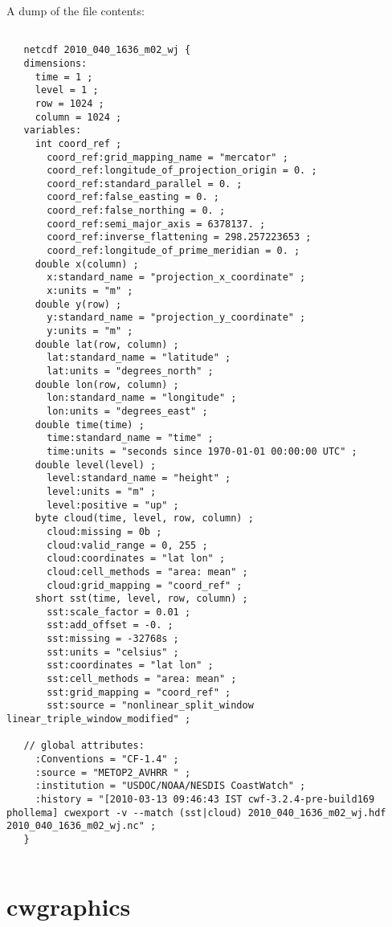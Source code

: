  A dump of the file contents: \begin{verbatim}

   netcdf 2010_040_1636_m02_wj {
   dimensions:
     time = 1 ;
     level = 1 ;
     row = 1024 ;
     column = 1024 ;
   variables:
     int coord_ref ;
       coord_ref:grid_mapping_name = "mercator" ;
       coord_ref:longitude_of_projection_origin = 0. ;
       coord_ref:standard_parallel = 0. ;
       coord_ref:false_easting = 0. ;
       coord_ref:false_northing = 0. ;
       coord_ref:semi_major_axis = 6378137. ;
       coord_ref:inverse_flattening = 298.257223653 ;
       coord_ref:longitude_of_prime_meridian = 0. ;
     double x(column) ;
       x:standard_name = "projection_x_coordinate" ;
       x:units = "m" ;
     double y(row) ;
       y:standard_name = "projection_y_coordinate" ;
       y:units = "m" ;
     double lat(row, column) ;
       lat:standard_name = "latitude" ;
       lat:units = "degrees_north" ;
     double lon(row, column) ;
       lon:standard_name = "longitude" ;
       lon:units = "degrees_east" ;
     double time(time) ;
       time:standard_name = "time" ;
       time:units = "seconds since 1970-01-01 00:00:00 UTC" ;
     double level(level) ;
       level:standard_name = "height" ;
       level:units = "m" ;
       level:positive = "up" ;
     byte cloud(time, level, row, column) ;
       cloud:missing = 0b ;
       cloud:valid_range = 0, 255 ;
       cloud:coordinates = "lat lon" ;
       cloud:cell_methods = "area: mean" ;
       cloud:grid_mapping = "coord_ref" ;
     short sst(time, level, row, column) ;
       sst:scale_factor = 0.01 ;
       sst:add_offset = -0. ;
       sst:missing = -32768s ;
       sst:units = "celsius" ;
       sst:coordinates = "lat lon" ;
       sst:cell_methods = "area: mean" ;
       sst:grid_mapping = "coord_ref" ;
       sst:source = "nonlinear_split_window linear_triple_window_modified" ;
 
   // global attributes:
     :Conventions = "CF-1.4" ;
     :source = "METOP2_AVHRR " ;
     :institution = "USDOC/NOAA/NESDIS CoastWatch" ;
     :history = "[2010-03-13 09:46:43 IST cwf-3.2.4-pre-build169 phollema] cwexport -v --match (sst|cloud) 2010_040_1636_m02_wj.hdf 2010_040_1636_m02_wj.nc" ;
   }
 
\end{verbatim}


\newpage
\section{cwgraphics} \hypertarget{cwgraphics}{}
